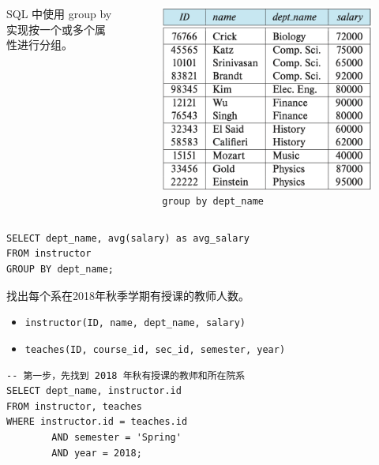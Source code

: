 \documentclass[aspectratio=169, 14pt]{beamer}
\begin{document}
\begin{frame}[fragile]
	\begin{columns}
		SQL 中使用 \alert{group by} 实现按一个或多个属性进行分组。
		\begin{figure}
			\includegraphics[width=\textwidth]{week5/group-salary}
			\caption*{\texttt{group by dept\_name}}
		\end{figure}
	\end{columns}
	\begin{verbatim}
SELECT dept_name, avg(salary) as avg_salary
FROM instructor
GROUP BY dept_name;
\end{verbatim}
\end{frame}

\begin{frame}[fragile]

	找出每个系在2018年秋季学期有授课的教师人数。

	\begin{itemize}
		\item \texttt{instructor(ID, name, dept\_name, salary)}
		\item \texttt{teaches(ID, course\_id, sec\_id, semester, year)}
	\end{itemize}



	\begin{verbatim}
-- 第一步，先找到 2018 年秋有授课的教师和所在院系
SELECT dept_name, instructor.id
FROM instructor, teaches
WHERE instructor.id = teaches.id 
        AND semester = 'Spring' 
        AND year = 2018;
\end{verbatim}


\end{frame}
\end{document}
